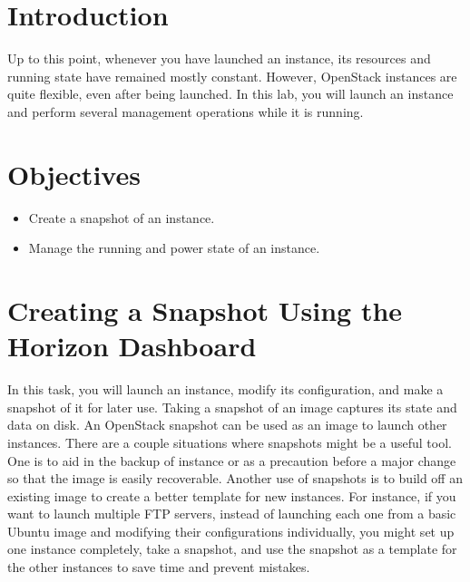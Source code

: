 \documentclass[letterpaper, 12pt]{article}
\begin{document}

\section*{Introduction}
\label{sec:introduction}
Up to this point, whenever you have launched an instance, its resources and running state have remained mostly constant.
However, OpenStack instances are quite flexible, even after being launched. In this lab, you will launch an instance and
perform several management operations while it is running.

\section*{Objectives}
\label{sec:objectives}
\begin{itemize}[itemsep=0pt]
    \item Create a snapshot of an instance.
    \item Manage the running and power state of an instance.
\end{itemize}
\clearpage

\labsettings

\section{Creating a Snapshot Using the Horizon Dashboard}
\label{sec:creating_a_snapshot_web}
In this task, you will launch an instance, modify its configuration, and make a snapshot of it for later use. Taking a
snapshot of an image captures its state and data on disk. An OpenStack snapshot can be used as an image to launch other
instances. There are a couple situations where snapshots might be a useful tool. One is to aid in the backup of instance
or as a precaution before a major change so that the image is easily recoverable. Another use of snapshots is to build
off an existing image to create a better template for new instances. For instance, if you want to launch multiple FTP
servers, instead of launching each one from a basic Ubuntu image and modifying their configurations individually, you
might set up one instance completely, take a snapshot, and use the snapshot as a template for the other instances to
save time and prevent mistakes.
\end{document}
